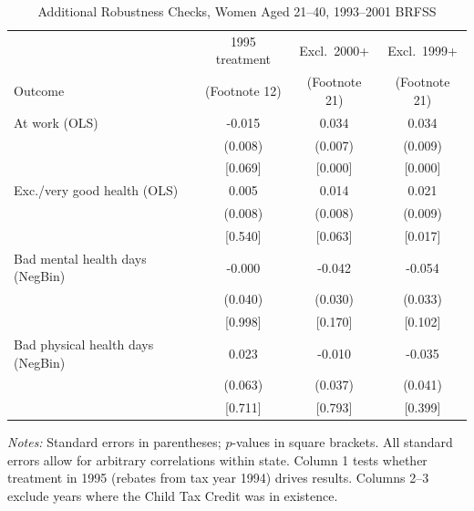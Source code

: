 \begin{table}[htbp]
\centering
\caption{Additional Robustness Checks, Women Aged 21--40, 1993--2001 BRFSS}
\begin{tabular}{lccc}
\toprule
 & 1995 treatment & Excl.\ 2000+ & Excl.\ 1999+ \\
Outcome & (Footnote 12) & (Footnote 21) & (Footnote 21) \\
\midrule
At work (OLS) & -0.015 & 0.034 & 0.034 \\
 & (0.008) & (0.007) & (0.009) \\
 & [0.069] & [0.000] & [0.000] \\
\addlinespace
Exc./very good health (OLS) & 0.005 & 0.014 & 0.021 \\
 & (0.008) & (0.008) & (0.009) \\
 & [0.540] & [0.063] & [0.017] \\
\addlinespace
Bad mental health days (NegBin) & -0.000 & -0.042 & -0.054 \\
 & (0.040) & (0.030) & (0.033) \\
 & [0.998] & [0.170] & [0.102] \\
\addlinespace
Bad physical health days (NegBin) & 0.023 & -0.010 & -0.035 \\
 & (0.063) & (0.037) & (0.041) \\
 & [0.711] & [0.793] & [0.399] \\
\bottomrule
\end{tabular}
\begin{minipage}{\linewidth}
\smallskip\footnotesize
\textit{Notes:} Standard errors in parentheses; $p$-values in square brackets.
 All standard errors allow for arbitrary correlations within state.
 Column 1 tests whether treatment in 1995 (rebates from tax year 1994) drives results.
 Columns 2--3 exclude years where the Child Tax Credit was in existence.
\end{minipage}
\end{table}
